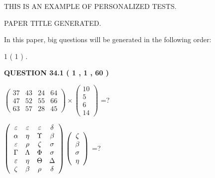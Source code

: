 \documentclass[12pt]{article}
\begin{document}
   
   
   
   
   
   
   
 \vspace{0.2in}
{\Huge  THIS IS AN EXAMPLE OF}
{\Huge  PERSONALIZED TESTS. }
   
   
 PAPER TITLE GENERATED.
   
   
   
\vspace{0.2in}
   
In this paper, big questions will be generated in the following order: 
   
   
             1 (           1 )
 .
  
\vspace{0.2in}
  
{\textbf{\Large{QUESTION
34.1 
 (           1 ,           1 ,          60 )
}}}
  
  
 
$ \left( \begin{array}{ccccccccc}
          37  & 
          43  & 
          24  & 
          64  \\ 
          47  & 
          52  & 
          55  & 
          66  \\ 
          63  & 
          57  & 
          28  & 
          45
\end{array}\right) \times
\left( \begin{array}{c}
          10  \\ 
           5  \\ 
           6  \\ 
          14
\end{array}\right) $ =?
 
 
$  %
 \left( \begin{array}
 {
 c
 c
 c
 c
 }
 \varepsilon & 
 \varepsilon & 
 \varepsilon & 
 \delta \\ 
 \alpha & 
 \eta & 
 \Upsilon & 
 \beta \\ 
 \varepsilon & 
 \rho & 
                    \zeta & 
 \sigma \\ 
 \Gamma & 
 \Lambda & 
 \Phi & 
 \sigma \\ 
 \varepsilon & 
 \eta & 
 \Theta & 
 \Delta \\ 
                    \zeta & 
 \beta & 
 \rho & 
 \delta
 \end{array} \right)
 \left( \begin{array}
 {
 c
 }
                    \zeta \\ 
 \beta \\ 
 \sigma \\ 
 \eta
 \end{array} \right)
$ =?
 
\end{document}
